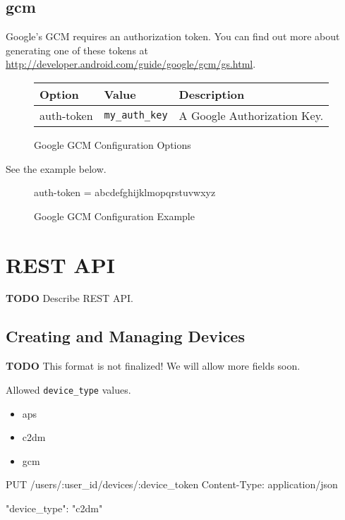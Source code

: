 \documentclass[12pt]{article}
\begin{document}
\subsection{gcm}

Google's GCM requires an authorization token.
You can find out more about generating one of these tokens at \url{http://developer.android.com/guide/google/gcm/gs.html}.

\begin{figure}[h!]
\centering
\begin{tabular}{l l l}
\hline
Option & Value & Description \\
\hline
auth-token & \verb|my_auth_key| & A Google Authorization Key. \\
\hline
\end{tabular}
\caption{Google GCM Configuration Options}
\end{figure}

See the example below.

\begin{figure}[h!]
\begin{Terminal}
[gcm]
auth-token = abcdefghijklmopqrstuvwxyz
\end{Terminal}
\caption{Google GCM Configuration Example}
\end{figure}

\section{REST API}

\textbf{TODO} Describe REST API.

\subsection{Creating and Managing Devices}

\textbf{TODO} This format is not finalized! We will allow more fields soon.

Allowed \verb|device_type| values.

\begin{itemize}
\item aps
\item c2dm
\item gcm
\end{itemize}

\begin{Terminal}
PUT /users/:user_id/devices/:device_token
Content-Type: application/json

{
  "device_type": "c2dm"
}
\end{Terminal}
\end{document}
